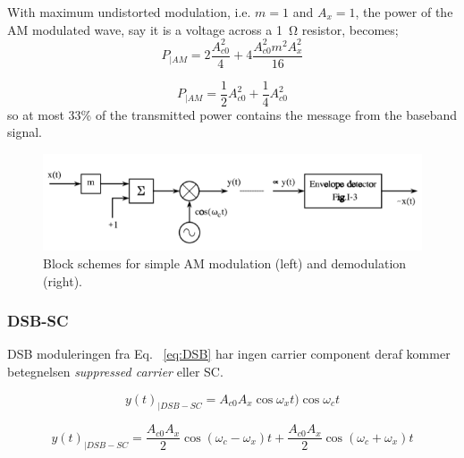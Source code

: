 \begin{mdframed}[style=exampledefault]
With maximum undistorted modulation, i.e. $m=1$ and $A_x = 1$, the power of the AM modulated wave, say it is a voltage across a \SI{1}{\ohm} resistor, becomes;\\
\begin{equation}\label{eq:AM_ex1}
P_{|AM} = 2 \dfrac{A_{c0}^2}{4} + 4 \dfrac{A_{c0}^2 m^2 A_x^2}{16}
\end{equation}

\begin{equation}\label{eq:ex2}
P_{|AM} = \dfrac{1}{2}A_{c0}^2 + \dfrac{1}{4}A_{c0}^2
\end{equation}
so at most 33\% of the transmitted power contains the message from the baseband signal.
\end{mdframed}

\begin{figure} [H]
	\centering
	\includegraphics[width=\linewidth]{graphics/6.png}
	\caption{ Block schemes for simple AM modulation (left) and demodulation (right).}
	\label{fig:6}
\end{figure}


\subsubsection{DSB-SC}
DSB moduleringen fra Eq. ~\ref{eq:DSB} har ingen carrier component deraf kommer betegnelsen \textit{suppressed carrier} eller SC.

\begin{equation}\label{eq:DSB_spectral1}
y(t)_{|DSB-SC} = A_{c0} A_x \cos \omega_x t) \cos \omega_c t
\end{equation}

\begin{equation}\label{eq:DSB_spectral2}
y(t)_{|DSB-SC}  = \dfrac{A_{c0}A_x}{2} \cos(\omega_c-\omega_x) t + \dfrac{A_{c0}A_x}{2} \cos(\omega_c+\omega_x) t
\end{equation}

